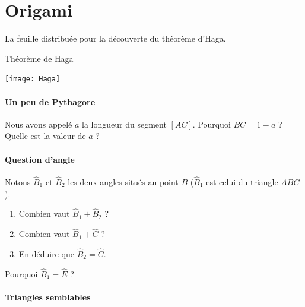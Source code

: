 
\section{Origami}

La feuille distribuée pour la découverte du théorème d'Haga.

\begin{feuilleExo}{Théorème de Haga}

    \begin{center}
\texttt{[image: Haga]}
    \end{center}

\paragraph{Un peu de Pythagore}


Nous avons appelé \( a\) la longueur du segment \( [AC]\). Pourquoi \( BC=1-a\) ? Quelle est la valeur de \( a\) ?

\paragraph{Question d'angle}

Notons \( \hat B_1\) et \( \hat B_2\) les deux angles situés au point \( B\) (\( \hat B_1\) est celui du triangle \( ABC\)).
\begin{enumerate}
    \item
        Combien vaut \( \hat B_1+\hat B_2\) ?
    \item
        Combien vaut \( \hat B_1+\hat C\) ?
    \item
        En déduire que \( \hat B_2=\hat C\).
\end{enumerate}
Pourquoi \( \hat B_1=\hat E\) ?

\paragraph{Triangles semblables}


\end{feuilleExo}
